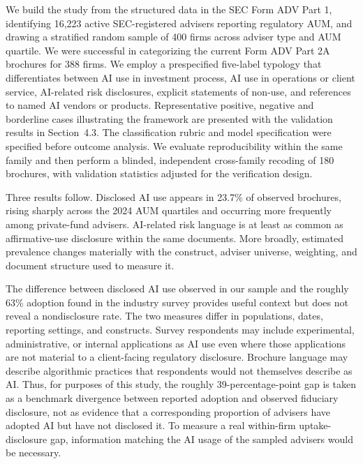 \documentclass[utf8]{FrontiersinHarvard}
\begin{document}
We build the study from the structured data in the SEC Form ADV Part 1, identifying 16{,}223 active SEC-registered advisers reporting regulatory AUM, and drawing a stratified random sample of 400 firms across adviser type and AUM quartile. We were successful in categorizing the current Form ADV Part 2A brochures for 388 firms. We employ a prespecified five-label typology that differentiates between AI use in investment process, AI use in operations or client service, AI-related risk disclosures, explicit statements of non-use, and references to named AI vendors or products. Representative positive, negative and borderline cases illustrating the framework are presented with the validation results in Section~4.3. The classification rubric and model specification were specified before outcome analysis. We evaluate reproducibility within the same family and then perform a blinded, independent cross-family recoding of 180 brochures, with validation statistics adjusted for the verification design.

Three results follow. Disclosed AI use appears in 23.7\% of observed brochures, rising sharply across the 2024 AUM
quartiles and occurring more frequently among private-fund advisers. AI-related risk language is at least as common as affirmative-use disclosure within the same documents. More broadly, estimated prevalence changes materially with the construct, adviser universe, weighting, and document structure used to measure it.

The difference between disclosed AI use observed in our sample and the roughly 63\% adoption found in the industry survey provides useful context but does not reveal a nondisclosure rate. The two measures differ in populations, dates, reporting settings, and constructs. Survey respondents may include experimental, administrative, or internal applications as AI use even where those applications are not material to a client-facing regulatory disclosure. Brochure language may describe algorithmic practices that respondents would not themselves describe as AI. Thus, for purposes of this study, the roughly 39-percentage-point gap is taken as a benchmark divergence between reported adoption and observed fiduciary disclosure, not as evidence that a corresponding proportion of advisers have adopted AI but have not disclosed it. To measure a real within-firm uptake-disclosure gap, information matching the AI usage of the sampled advisers would be necessary.
\end{document}
